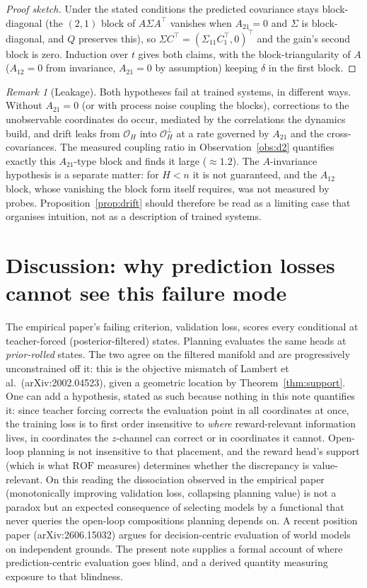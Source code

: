 \documentclass[11pt]{article}
\theoremstyle{remark}
\newtheorem{remark}{Remark}
\newcommand{\Obs}{\mathcal{O}}
\newcommand{\ROF}{\mathrm{ROF}}
\begin{document}
\begin{proof}[Proof sketch]
Under the stated conditions the predicted covariance stays block-diagonal (the $(2,1)$ block of $A \Sigma A^\top$ vanishes when $A_{21}=0$ and $\Sigma$ is block-diagonal, and $Q$ preserves this), so $\Sigma C^\top = (\Sigma_{11} C_1^\top, 0)^\top$ and the gain's second block is zero. Induction over $t$ gives both claims, with the block-triangularity of $A$ ($A_{12}=0$ from invariance, $A_{21}=0$ by assumption) keeping $\delta$ in the first block.
\end{proof}

\begin{remark}[Leakage]
Both hypotheses fail at trained systems, in different ways. Without $A_{21} = 0$ (or with process noise coupling the blocks), corrections to the unobservable coordinates do occur, mediated by the correlations the dynamics build, and drift leaks from $\Obs_H$ into $\Obs_H^\perp$ at a rate governed by $A_{21}$ and the cross-covariances. The measured coupling ratio in Observation~\ref{obs:d2} quantifies exactly this $A_{21}$-type block and finds it large ($\approx 1.2$). The $A$-invariance hypothesis is a separate matter: for $H < n$ it is not guaranteed, and the $A_{12}$ block, whose vanishing the block form itself requires, was not measured by probes. Proposition~\ref{prop:drift} should therefore be read as a limiting case that organises intuition, not as a description of trained systems.
\end{remark}

\section{Discussion: why prediction losses cannot see this failure mode}

The empirical paper's failing criterion, validation loss, scores every conditional at teacher-forced (posterior-filtered) states. Planning evaluates the same heads at \emph{prior-rolled} states. The two agree on the filtered manifold and are progressively unconstrained off it: this is the objective mismatch of Lambert et al.\ (arXiv:2002.04523), given a geometric location by Theorem~\ref{thm:support}. One can add a hypothesis, stated as such because nothing in this note quantifies it: since teacher forcing corrects the evaluation point in all coordinates at once, the training loss is to first order insensitive to \emph{where} reward-relevant information lives, in coordinates the $z$-channel can correct or in coordinates it cannot. Open-loop planning is not insensitive to that placement, and the reward head's support (which is what $\ROF$ measures) determines whether the discrepancy is value-relevant. On this reading the dissociation observed in the empirical paper (monotonically improving validation loss, collapsing planning value) is not a paradox but an expected consequence of selecting models by a functional that never queries the open-loop compositions planning depends on. A recent position paper (arXiv:2606.15032) argues for decision-centric evaluation of world models on independent grounds. The present note supplies a formal account of where prediction-centric evaluation goes blind, and a derived quantity measuring exposure to that blindness.
\end{document}
